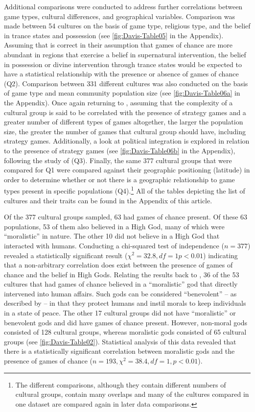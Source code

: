 \documentclass[%
	]{ijsra}
\begin{document}
Additional comparisons were conducted to address further correlations between game types, cultural differences, and geographical variables. Comparison was made between 54 cultures on the basis of game type, religious type, and the belief in trance states and possession (see \cref{fig:Davis-Table05} in the Appendix). Assuming that \textcite{roberts1959} is correct in their assumption that games of chance are more abundant in regions that exercise a belief in supernatural intervention, the belief in possession or divine intervention through trance states would be expected to have a statistical relationship with the presence or absence of games of chance (Q2). Comparison between 331 different cultures was also conducted on the basis of game type and mean community population size (see \cref{fig:Davis-Table06a} in the Appendix). Once again returning to \textcite{roberts1959}, assuming that the complexity of a cultural group is said to be correlated with the presence of strategy games and a greater number of different types of games altogether, the larger the population size, the greater the number of games that cultural group should have, including strategy games. Additionally, a look at political integration is explored in relation to the presence of strategy games (see \cref{fig:Davis-Table06b} in the Appendix), following the study of \textcite{roberts1959} (Q3). Finally, the same 377 cultural groups that were compared for Q1 were compared against their geographic positioning (latitude) in order to determine whether or not there is a geographic relationship to game types present in specific populations (Q4).\footnote{The different comparisons, although they contain different numbers of cultural groups, contain many overlaps and many of the cultures compared in one dataset are compared again in later data comparisons.} All of the tables depicting the list of cultures and their traits can be found in the Appendix of this article.

Of the 377 cultural groups sampled, 63 had games of chance present. Of these 63 populations, 53 of them also believed in a High God, many of which were ``moralistic” in nature. The other 10 did not believe in a High God that interacted with humans. Conducting a chi-squared test of independence ($n = 377$) revealed a statistically significant result ($\chi^{2} = 32.8, df = 1 p < 0.01$) indicating that a non-arbitrary correlation does exist between the presence of games of chance and the belief in High Gods. Relating the results back to \textcite{roberts1959}, 36 of the 53 cultures that had games of chance believed in a ``moralistic” god that directly intervened into human affairs. Such gods can be considered ``benevolent” – as described by \textcite{lambert1959} – in that they protect humans and instil morals to keep individuals in a state of peace. The other 17 cultural groups did not have ``moralistic” or benevolent gods and did have games of chance present. However, non-moral gods consisted of 128 cultural groups, whereas moralistic gods consisted of 65 cultural groups (see \cref{fig:Davis-Table02}). Statistical analysis of this data revealed that there is a statistically significant correlation between moralistic gods and the presence of games of chance ($n = 193, \chi^{2} = 38.4, df = 1, p < 0.01$).
\end{document}
